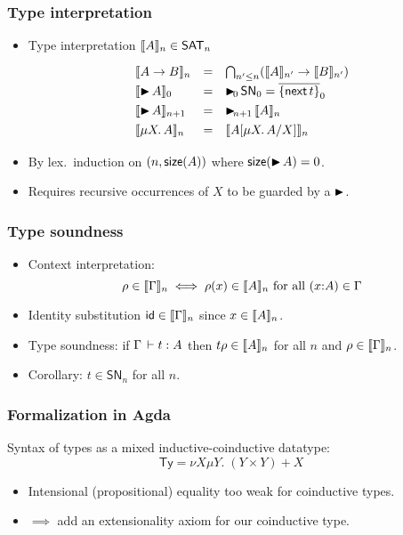 \documentclass[t]{beamer}
\newcommand{\nex}{\tnext\,}
\newcommand{\clos}[1]{\overline{#1}}
\renewcommand{\SN}{\mathsf{SN}}
\newcommand{\SAT}{\mathsf{SAT}}
\newcommand{\slater}[1]{\tlater\!_{#1}\,}
\newcommand{\tid}{\mathsf{id}}
\newcommand{\cAnn}{\color{red!80!black}}%
\renewcommand{\emph}[1]{{\cAnn#1}}
\newcommand{\muT}[2]{\mu {#1} \hspace{-0.1em} . \,  {#2}}
\begin{document}
\begin{frame}%
  \frametitle{Type interpretation}
  \begin{itemize}
  \item Type interpretation $\Den A n \in \SAT_n$
\[
\def\arraystretch{1.3}
 \begin{array}{lcl}
   \Den{A \to B}n & = & \bigcap_{n' \leq n} (\Den A{n'} \to \Den{B}{n'})
   \\
   \Den{\later A}0 & = & \slater 0 \SN_0 = \clos{\{ \nex t \}}_0 \\
   \Den{\later A}{n+1} & = & \slater{n+1} \Den A n \\
   \Den{\muT X A}n & = & \Den{\subst {\muT X A} X A}n \\
 \end{array}
\]
\vspace{-2ex}
\item
By lex.\ induction on $(n,\mathsf{size}(A))$ where $\mathsf{size}(\mathord{\blacktriangleright}\, A) = 0$.
\item Requires recursive occurrences of $X$ to be \emph{guarded} by a $\mathord{\blacktriangleright}$.
  \end{itemize}
\end{frame}


\begin{frame}%
  \frametitle{Type soundness}
  \begin{itemize}
  \item Context interpretation:
\[
  \rho \in \llbracket \Gamma \rrbracket_{n} \iff \rho(x) \in \llbracket A \rrbracket_{n} \ \mbox{for all}\ 
  (x{:}A) \in \Gamma
\]
\vspace{-2ex}
  \item Identity substitution $\tid \in \Den \Gamma n$ since $x \in \llbracket A \rrbracket_{n}$.
  \item Type soundness: if $\Gamma \,\vdash t : A$ then $t \rho \in \llbracket A \rrbracket_{n}$ for all $n$ and $\rho \in \llbracket \Gamma \rrbracket_{n}$.
  \item Corollary: $t \in \SN_n$ for all $n$.
  \end{itemize}
\end{frame}


\begin{frame}%
  \frametitle{Formalization in Agda}
  \vspace{-10pt}
  Syntax of types as a mixed inductive-coinductive datatype:
  \vspace{-5pt}
  \[\mathsf{Ty} = \nu X \mu Y.\; (Y \times Y) + X \]
  \vspace{-30pt}
  
  \begin{itemize}
  \item Intensional (propositional) equality too weak for coinductive
    types.
  \item $\implies$ add an extensionality axiom for our coinductive type.
  \end{itemize}
\end{frame}
\end{document}
